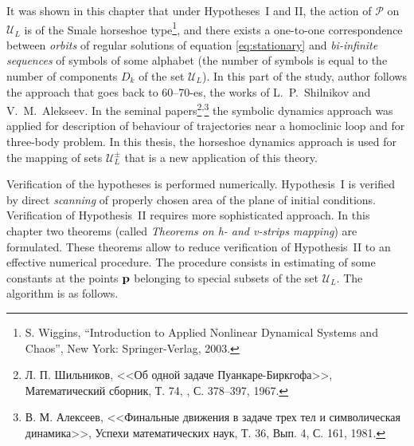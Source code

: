 \documentclass[candidate, href, colorlinks]{disser}
\begin{document}
It was shown in this chapter that under Hypotheses~I and II, the action of $\mathcal{P}$ on $\mathscr{U}_L$ is of the Smale horseshoe type\footnote{S. Wiggins, ``Introduction to Applied Nonlinear Dynamical Systems and Chaos'', New York: Springer-Verlag, 2003.}, and there exists a one-to-one correspondence between {\it orbits} of regular solutions of equation \eqref{eq:stationary} and {\it bi-infinite sequences} of symbols of some alphabet (the number of symbols is equal to the number of components $D_k$ of the set $\mathscr{U}_L$).
In this part of the study, author follows the approach that goes back to 60--70-es, the works of L.~P.~Shilnikov and V.~M.~Alekseev.
In the seminal papers\footnote{Л. П. Шильников, <<Об одной задаче Пуанкаре-Биркгофа>>, Математический сборник, Т. 74, , С. 378--397,  1967.}\textsuperscript{,}\footnote{В. М. Алексеев, <<Финальные движения в задаче трех тел и символическая динамика>>, Успехи математических наук, Т. 36, Вып. 4, С. 161, 1981.} the symbolic dynamics approach was applied for description of behaviour of trajectories near a homoclinic loop and for three-body problem.
In this thesis, the horseshoe dynamics approach is used for the mapping of sets $\mathscr{U}_L^{\pm}$ that is a new application of this theory.


Verification of the hypotheses is performed numerically.
Hypothesis~I is verified by direct {\it scanning} of properly chosen area of the plane of initial conditions.
Verification of Hypothesis~II requires more sophisticated approach.
In this chapter two theorems (called {\it Theorems on h- and v-strips mapping}) are formulated.
These theorems allow to reduce verification of Hypothesis~II to an effective numerical procedure.
The procedure consists in estimating of some constants at the points $\vb{p}$ belonging to special subsets of the set $\mathscr{U}_L$.
The algorithm is as follows.
\end{document}
